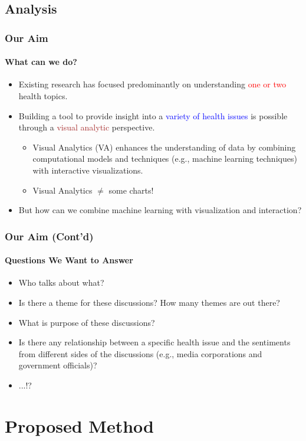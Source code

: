 \documentclass[11pt]{beamer}
\begin{document}
\subsection{Analysis}
\begin{frame}
\frametitle{Our Aim}
\framesubtitle{What can we do?}
	\begin{itemize}
		\item<1-> Existing research has focused predominantly on understanding \textcolor{red}{one or two} health topics.
		\item<2-> Building a tool to provide insight into a \textcolor{blue}{variety of health issues} is possible through a \textcolor{brown}{visual analytic} perspective.
		\begin{itemize}
			\item<3-> Visual Analytics (VA) enhances the understanding of data by combining computational models and techniques (e.g., machine learning techniques) with interactive visualizations.
			\item<4-> Visual Analytics $\neq$ some charts!
		\end{itemize}
		\item<5-> But how can we combine machine learning with visualization and interaction?
	\end{itemize}
\end{frame}

\begin{frame}
\frametitle{Our Aim (Cont'd)}
\framesubtitle{Questions We Want to Answer}
\begin{itemize}
	\item Who talks about what?
	\item Is there a theme for these discussions? How many themes are out there?
	\item What is purpose of these discussions?
	\item Is there any relationship between a specific health issue and the sentiments from different sides of the discussions (e.g., media corporations and government officials)?
	\item ...!?
\end{itemize}
\end{frame}

\section{Proposed Method}
\end{document}
